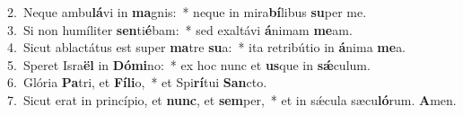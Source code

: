 {2.~}Neque ambu\textbf{lá}vi in \textbf{ma}gnis:~* neque in mira\textbf{bí}libus \textbf{su}per me.\\
{3.~}Si non humíliter \textbf{sen}ti\textbf{é}bam:~* sed exaltávi \textbf{á}nimam \textbf{me}am.\\
{4.~}Sicut ablactátus est super \textbf{ma}tre \textbf{su}a:~* ita retribútio in \textbf{á}nima \textbf{me}a.\\
{5.~}Speret Isra\textbf{ël} in \textbf{Dó}\textbf{mi}no:~* ex hoc nunc et \textbf{us}que in \textbf{sǽ}culum.\\
{6.~}Glória \textbf{Pa}tri, et \textbf{Fí}\textbf{li}o,~* et Spi\textbf{rí}tui \textbf{San}cto.\\
{7.~}Sicut erat in princípio, et \textbf{nunc}, et \textbf{sem}per,~* et in sǽcula sæcu\textbf{ló}rum. \textbf{A}men.\\
